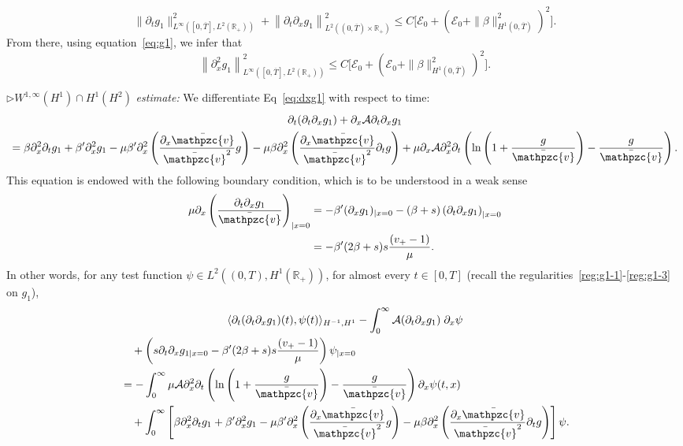 \documentclass[AHL,Unicode,longabstracts,published]{cedram}
\newcommand{\R}{\mathbb{R}}
\newcommand{\p}{\partial}
\newcommand{\bv}{\bar{\mathpzc{v}}}
\newcommand{\cA}{\mathcal A}
\newcommand{\cE}{\mathcal E}
\begin{document}
\begin{equation}
\|\partial_t g_1\|_{L^\infty\left([0, \overline{T}], L^2(\R_+)\right)}^2 + \left\|\partial_t \partial_x g_1\right\|_{L^2\left((0,\overline{T}) \times \R_+\right)}^2
\leq C \Big[\cE_0 + \left(\cE_0 +\|\beta\|_{H^1\left(0,\overline{T}\right)}^2\right)^2 \Big].
\end{equation}
From there, using equation~\eqref{eq:g1}, we infer that
\[
\left\|\p_x^2 g_1\right\|_{L^\infty\left([0, \overline{T}], L^2(\R_+)\right)}^2\leq C \Big[\cE_0 + \left(\cE_0 +\|\beta\|_{H^1\left(0,\overline{T}\right)}^2\right)^2 \Big].
\]



$\rhd W^{1,\infty}(H^1)\cap H^1(H^2)$ \emph{estimate:} We differentiate Eq~\eqref{eq:dxg1} with respect to time:
\begin{multline}\label{eq:dtdx-g1}
\partial_t (\partial_t \partial_x g_1) + \partial_x \cA \partial_t \partial_x g_1 \\
 = \beta \partial^2_x \partial_t g_1 + \beta'\partial^2_x g_1 - \mu \beta' \partial^2_x \left(\dfrac{\partial_x \bv}{\bv^2} g\right)
- \mu \beta \partial^2_x \left(\dfrac{\partial_x \bv}{\bv^2} \partial_t g\right) + \mu \partial_x \cA \partial_x^2 \partial_t \left(\ln \left(1+ \dfrac{g}{\bv}\right) - \dfrac{g}{\bv} \right).
\end{multline}
This equation is endowed with the following boundary condition, which is to be understood in a weak sense
\begin{equation}\label{BC:px2g1-0}
\begin{aligned}
\mu \partial_x \left(\dfrac{\partial_t\partial_x g_1}{\bv}\right)_{|x=0} & = -\beta'(\partial_x g_1)_{|x=0} - (\beta+s) \left(\partial_t \partial_x g_1\right)_{|x=0}  \\
& = - \beta'(2\beta +s)s \dfrac{(v_+-1)}{\mu}.
\end{aligned}
\end{equation}
In other words, for any test function $\psi\in L^2((0,T), H^1(\R_+))$, for almost every $t\in [0,T]$ (recall the regularities~\eqref{reg:g1-1}-\eqref{reg:g1-3} on $g_1$),
\begin{multline}\label{weak-dtdxg1}
\langle \p_t (\p_t\p_x g_1)(t), \psi(t)\rangle_{H^{-1}, H^1} -\int_0^\infty \cA(\p_t\p_x g_1)\; \p_x \psi \\
\begin{aligned}
&\quad+\left(s\p_t\p_x g_{1|x=0} - \beta'(2\beta +s)s \dfrac{(v_+-1)}{\mu}\right)\psi_{|x=0}\\
&=-\int_0^\infty \mu \cA \p_x^2 \p_t \left(\ln \left(1+ \dfrac{g}{\bv}\right) - \dfrac{g}{\bv} \right) \p_x \psi(t,x) \\
&\quad +\int_0^\infty \left[\beta \p_x^2\p_t g_1 + \beta'\partial^2_x g_1 - \mu \beta' \partial^2_x \left(\dfrac{\partial_x \bv}{\bv^2} g\right) - \mu \beta \partial^2_x \left(\dfrac{\partial_x \bv}{\bv^2} \partial_t g\right) \right] \psi.
\end{aligned}
\end{multline}
\end{document}
